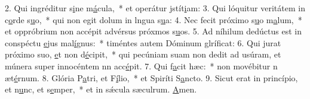 2. Qui ingréditur s\uline{i}ne m\uline{á}cula,~* et operátur jstít\uline{i}am:
3. Qui lóquitur veritátem in c\uline{o}rde s\uline{u}o,~* qui non egit dolum in lngua s\uline{u}a:
4. Nec fecit próximo s\uline{u}o m\uline{a}lum,~* et oppróbrium non accépit advérsus próxmos s\uline{u}os.
5. Ad níhilum dedúctus est in conspéctu \uline{e}jus mal\uline{í}gnus:~* timéntes autem Dóminum glríf\uline{i}cat:
6. Qui jurat próximo suo, \uline{e}t non d\uline{é}cipit,~* qui pecúniam suam non dedit ad usúram, et múnera super innocéntem nn acc\uline{é}pit.
7. Qui f\uline{a}cit hæc:~* non movébitur n æt\uline{é}rnum.
8. Glória P\uline{a}tri, et F\uline{í}lio,~* et Spiríti S\uline{a}ncto.
9. Sicut erat in princípio, et n\uline{u}nc, et s\uline{e}mper,~* et in sǽcula sæculrum. \uline{A}men.
